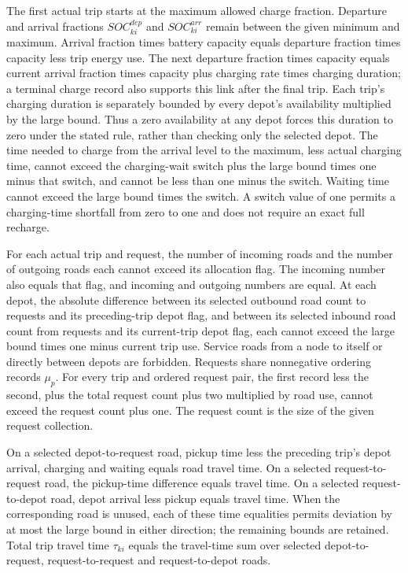 \documentclass[10pt]{article}
\begin{document}
The first actual trip starts at the maximum allowed charge fraction. Departure and arrival fractions $SOC^{dep}_{ki}$ and $SOC^{arr}_{ki}$ remain between the given minimum and maximum. Arrival fraction times battery capacity equals departure fraction times capacity less trip energy use. The next departure fraction times capacity equals current arrival fraction times capacity plus charging rate times charging duration; a terminal charge record also supports this link after the final trip. Each trip's charging duration is separately bounded by every depot's availability multiplied by the large bound. Thus a zero availability at any depot forces this duration to zero under the stated rule, rather than checking only the selected depot. The time needed to charge from the arrival level to the maximum, less actual charging time, cannot exceed the charging-wait switch plus the large bound times one minus that switch, and cannot be less than one minus the switch. Waiting time cannot exceed the large bound times the switch. A switch value of one permits a charging-time shortfall from zero to one and does not require an exact full recharge.

For each actual trip and request, the number of incoming roads and the number of outgoing roads each cannot exceed its allocation flag. The incoming number also equals that flag, and incoming and outgoing numbers are equal. At each depot, the absolute difference between its selected outbound road count to requests and its preceding-trip depot flag, and between its selected inbound road count from requests and its current-trip depot flag, each cannot exceed the large bound times one minus current trip use. Service roads from a node to itself or directly between depots are forbidden. Requests share nonnegative ordering records $\mu_p$. For every trip and ordered request pair, the first record less the second, plus the total request count plus two multiplied by road use, cannot exceed the request count plus one. The request count is the size of the given request collection.

On a selected depot-to-request road, pickup time less the preceding trip's depot arrival, charging and waiting equals road travel time. On a selected request-to-request road, the pickup-time difference equals travel time. On a selected request-to-depot road, depot arrival less pickup equals travel time. When the corresponding road is unused, each of these time equalities permits deviation by at most the large bound in either direction; the remaining bounds are retained. Total trip travel time $\tau_{ki}$ equals the travel-time sum over selected depot-to-request, request-to-request and request-to-depot roads.
\end{document}

